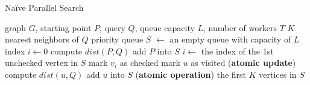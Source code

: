 \begin{algorithm}
\caption{Na\"ive Parallel Search}\label{algo:naive_para_search}
\begin{algorithmic}[1]
\REQUIRE graph $G$, starting point $P$, query $Q$, queue capacity $L$, number of workers $T$
\ENSURE $K$ nearest neighbors of $Q$
\STATE priority queue $S$ $\gets$ an empty queue with capacity of $L$
\STATE index $i \gets 0$
\STATE compute $dist(P, Q)$
\STATE add $P$ into $S$
    \STATE $i \gets$ the index of the 1st unchecked vertex in $S$
    \STATE mark $v_i$ as checked
         \label{algo_line:naive_check_visited}
            \STATE mark $u$ as visited (\textbf{atomic update}) \label{algo_line:naive_modify_visited}
            \STATE compute $dist(u, Q)$ \label{algo_line:naive_compute}
            \STATE add $u$ into $S$ (\textbf{atomic operation}) \label{algo_line:naive_add}
        \ENDIF
    \ENDFOR
\ENDWHILE
\RETURN the first $K$ vertices in $S$
\end{algorithmic}
\end{algorithm}